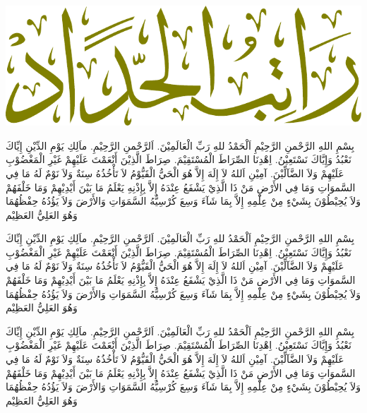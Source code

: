 \documentclass{article}
\newcommand{\basmalah}[1]{{\basmalahfont{\XeTeXglyph 20}}}
\newcommand{\thayyibah}[1]{{\shadatainfont{\XeTeXglyph 7}}}
\newcommand{\shalawat}[1]{{\symbolfont{\XeTeXglyph 41}}}
\begin{document}
% 
\includegraphics[scale=0.5,page=1]{ratib-alhaddad-title.pdf}

\basmalah\\

\thayyibah\\

\shalawat\\

\arabicfont
  بِسْمِ اللهِ الرَّحْمنِ الرَّحِيْمِ اَلْحَمْدُ للهِ رَبِّ الْعَالَمِيْنَ. اَلرَّحْمنِ الرَّحِيْمِ. ماَلِكِ يَوْمِ الدِّيْنِ إِيِّاكَ نَعْبُدُ وَإِيَّاكَ نَسْتَعِيْنُ. اِهْدِنَا الصِّرَاطَ الْمُسْتَقِيْمَ. صِرَاطَ الَّذِيْنَ أَنْعَمْتَ عَلَيْهِمْ غَيْرِ الْمَغْضُوْبِ عَلَيْهِمْ وَلاَ الضَّآلِّيْنَ. آمِيْنِ
  اَللهُ لاَ إِلَهَ إِلاَّ هُوَ الْحَيُّ الْقَيُّوْمُ لاَ تَأْخُذُهُ سِنَةٌ وَلاَ نَوْمٌ لَهُ مَا فِي السَّموَاتِ وَمَا فِي الأَرْضِ مَنْ ذَا الَّذِيْ يَشْفَعُ عِنْدَهُ إِلاَّ بِإِذْنِهِ يَعْلَمُ مَا بَيْنَ أَيْدِيْهِمْ وَمَا خَلْفَهُمْ وَلاَ يُحِيْطُوْنَ بِشَيْءٍ مِنْ عِلْمِهِ إِلاَّ بِمَا شَآءَ وَسِعَ كُرْسِيُّهُ السَّمَوَاتِ وَالأَرْضَ  وَلاَ يَؤُدُهُ حِفْظُهُمَا وَهُوَ العَلِيُّ العَظِيْم

  بِسْمِ اللهِ الرَّحْمنِ الرَّحِيْمِ اَلْحَمْدُ للهِ رَبِّ الْعَالَمِيْنَ. اَلرَّحْمنِ الرَّحِيْمِ. ماَلِكِ يَوْمِ الدِّيْنِ إِيِّاكَ نَعْبُدُ وَإِيَّاكَ نَسْتَعِيْنُ. اِهْدِنَا الصِّرَاطَ الْمُسْتَقِيْمَ. صِرَاطَ الَّذِيْنَ أَنْعَمْتَ عَلَيْهِمْ غَيْرِ الْمَغْضُوْبِ عَلَيْهِمْ وَلاَ الضَّآلِّيْنَ. آمِيْنِ
  اَللهُ لاَ إِلَهَ إِلاَّ هُوَ الْحَيُّ الْقَيُّوْمُ لاَ تَأْخُذُهُ سِنَةٌ وَلاَ نَوْمٌ لَهُ مَا فِي السَّموَاتِ وَمَا فِي الأَرْضِ مَنْ ذَا الَّذِيْ يَشْفَعُ عِنْدَهُ إِلاَّ بِإِذْنِهِ يَعْلَمُ مَا بَيْنَ أَيْدِيْهِمْ وَمَا خَلْفَهُمْ وَلاَ يُحِيْطُوْنَ بِشَيْءٍ مِنْ عِلْمِهِ إِلاَّ بِمَا شَآءَ وَسِعَ كُرْسِيُّهُ السَّمَوَاتِ وَالأَرْضَ  وَلاَ يَؤُدُهُ حِفْظُهُمَا وَهُوَ العَلِيُّ العَظِيْم

  بِسْمِ اللهِ الرَّحْمنِ الرَّحِيْمِ اَلْحَمْدُ للهِ رَبِّ الْعَالَمِيْنَ. اَلرَّحْمنِ الرَّحِيْمِ. ماَلِكِ يَوْمِ الدِّيْنِ إِيِّاكَ نَعْبُدُ وَإِيَّاكَ نَسْتَعِيْنُ. اِهْدِنَا الصِّرَاطَ الْمُسْتَقِيْمَ. صِرَاطَ الَّذِيْنَ أَنْعَمْتَ عَلَيْهِمْ غَيْرِ الْمَغْضُوْبِ عَلَيْهِمْ وَلاَ الضَّآلِّيْنَ. آمِيْنِ
  اَللهُ لاَ إِلَهَ إِلاَّ هُوَ الْحَيُّ الْقَيُّوْمُ لاَ تَأْخُذُهُ سِنَةٌ وَلاَ نَوْمٌ لَهُ مَا فِي السَّموَاتِ وَمَا فِي الأَرْضِ مَنْ ذَا الَّذِيْ يَشْفَعُ عِنْدَهُ إِلاَّ بِإِذْنِهِ يَعْلَمُ مَا بَيْنَ أَيْدِيْهِمْ وَمَا خَلْفَهُمْ وَلاَ يُحِيْطُوْنَ بِشَيْءٍ مِنْ عِلْمِهِ إِلاَّ بِمَا شَآءَ وَسِعَ كُرْسِيُّهُ السَّمَوَاتِ وَالأَرْضَ  وَلاَ يَؤُدُهُ حِفْظُهُمَا وَهُوَ العَلِيُّ العَظِيْم
\end{document}
